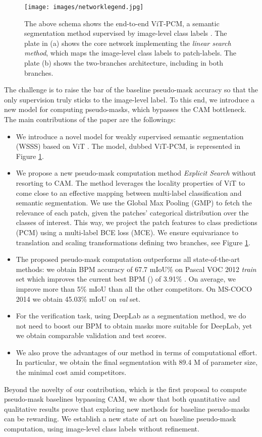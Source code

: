 \documentclass[runningheads]{styles/llncs}
\begin{document}
\begin{figure}[t!]
  \centering
  \texttt{[image: images/networklegend.jpg]}
   \caption{The above schema shows the end-to-end ViT-PCM, a semantic segmentation method supervised by image-level class labels . The plate in (a) shows the core network  implementing the {\em linear search method}, which maps the image-level class labels to patch-labels. The plate (b) shows the two-branches architecture, including  in both branches.  }
   \label{fig:network}
\end{figure}

The challenge is to raise the bar of the baseline pseudo-mask accuracy so that the only supervision truly sticks to the image-level label. To this end, we introduce a new model for computing pseudo-masks, which bypasses the CAM bottleneck.
The main contributions of the paper are the followings:
\begin{itemize} \setlength{\parskip}{0pt}  \setlength{\itemsep}{0pt plus 1pt}
\item  We introduce a novel model for weakly supervised semantic segmentation (WSSS) based on ViT \cite{dosovitskiy2021image}. The model, dubbed ViT-PCM, is represented in Figure \ref{fig:network}. 
\item We propose a new pseudo-mask computation method {\em Explicit Search}  without resorting to CAM. The method leverages the locality properties of ViT to come close to an effective mapping between multi-label classification and semantic segmentation. We use the Global Max Pooling (GMP) to fetch the relevance of each patch, given the patches' categorical distribution over the classes of interest. This way, we project the patch features to class predictions (PCM) using a multi-label BCE loss (MCE).   We ensure equivariance to translation and scaling transformations defining two branches, see Figure \ref{fig:network}. 
\item The proposed pseudo-mask computation outperforms all state-of-the-art methods: we obtain BPM accuracy of 67.7 mIoU\% on Pascal VOC 2012 \textit{train} set which improves the current best BPM (\cite{ru2022learning}) of 3.91\% . On average, we improve more than 5\% mIoU than all the other competitors. On MS-COCO 2014 we obtain 45.03\% mIoU on \textit{val} set.
\item For the verification task, using  DeepLab as a segmentation method,  we do not need to boost our BPM to obtain masks more suitable for DeepLab, yet we obtain comparable validation and test scores.
\item We also prove the advantages of our method in terms of computational effort. In particular, we obtain the final segmentation with 89.4 M of parameter size, the minimal cost amid competitors. 
\end{itemize}
\vspace{-\topsep}
Beyond the novelty of our contribution, which is the first proposal to compute pseudo-mask baselines bypassing CAM, we show that both quantitative and qualitative results prove that exploring new methods for baseline pseudo-masks can be rewarding. We establish a new state of art on baseline pseudo-mask computation, using image-level class labels without refinement. 
\end{document}
